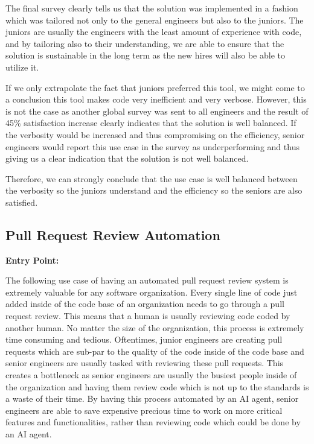 \documentclass[]{imc-inf}
\begin{document}
The final survey clearly tells us that the solution was implemented in a fashion which was tailored not only to the general engineers but also to the juniors. The juniors are usually the engineers with the least amount of experience with code, and by tailoring also to their understanding, we are able to ensure that the solution is sustainable in the long term as the new hires will also be able to utilize it. 

If we only extrapolate the fact that juniors preferred this tool, we might come to a conclusion this tool makes code very inefficient and very verbose. However, this is not the case as another global survey was sent to all engineers and the result of 45\% satisfaction increase clearly indicates that the solution is well balanced. If the verbosity would be increased and thus compromising on the efficiency, senior engineers would report this use case in the survey as underperforming and thus giving us a clear indication that the solution is not well balanced.

Therefore, we can strongly conclude that the use case is well balanced between the verbosity so the juniors understand and the efficiency so the seniors are also satisfied.


\subsection{Pull Request Review
	Automation}\label{pull-request-review-automation}

\textbf{Entry Point:} 

The following use case of having an automated pull request review system is extremely valuable for any software organization. Every single line of code just added inside of the code base of an organization needs to go through a pull request review. This means that a human is usually reviewing code coded by another human. No matter the size of the organization, this process is extremely time consuming and tedious. Oftentimes, junior engineers are creating pull requests which are sub-par to the quality of the code inside of the code base and senior engineers are usually tasked with reviewing these pull requests. This creates a bottleneck as senior engineers are usually the busiest people inside of the organization and having them review code which is not up to the standards is a waste of their time. By having this process automated by an AI agent, senior engineers are able to save expensive precious time to work on more critical features and functionalities, rather than reviewing code which could be done by an AI agent.
\end{document}
